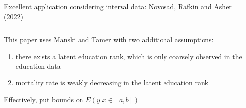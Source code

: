 \documentclass[notes,11pt, aspectratio=169]{beamer}
\newenvironment{wideitemize}{\itemize\addtolength{\itemsep}{10pt}}{\enditemize}
\begin{document}
\begin{frame}{Excellent application considering interval data: Novosad, Rafkin and Asher (2022)}
      \begin{columns}[onlytextwidth, T] %
        \begin{column}{.5\textwidth}
          \begin{wideitemize}
          \item This paper uses Manski and Tamer with two additional assumptions:
            \begin{enumerate}
            \item there exists a latent
              education rank, which is only coarsely observed in the
              education data
            \item mortality rate is weakly decreasing in the latent
              education rank
            \end{enumerate}
          \item Effectively, put bounds on $E(y | x \in [a,b])$
          \end{wideitemize}
      \end{column}%
      \hfill%
      \begin{column}{.5\textwidth}

\end{column}
\end{columns}
\end{frame}
\end{document}

